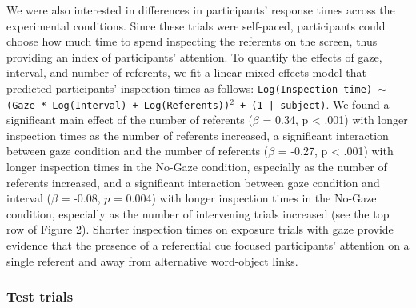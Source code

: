 \documentclass[oneside]{report}
\begin{document}
We were also interested in differences in participants' response times
across the experimental conditions. Since these trials were self-paced,
participants could choose how much time to spend inspecting the
referents on the screen, thus providing an index of participants'
attention. To quantify the effects of gaze, interval, and number of
referents, we fit a linear mixed-effects model that predicted
participants' inspection times as follows:
\texttt{Log(Inspection time) $\sim$ (Gaze * Log(Interval) + Log(Referents))$^2$ + (1 | subject)}.
We found a significant main effect of the number of referents (\(\beta\)
= 0.34, p \textless{} .001) with longer inspection times as the number
of referents increased, a significant interaction between gaze condition
and the number of referents (\(\beta\) = -0.27, p \textless{} .001) with
longer inspection times in the No-Gaze condition, especially as the
number of referents increased, and a significant interaction between
gaze condition and interval (\(\beta\) = -0.08, \(p\) = 0.004) with
longer inspection times in the No-Gaze condition, especially as the
number of intervening trials increased (see the top row of Figure 2).
Shorter inspection times on exposure trials with gaze provide evidence
that the presence of a referential cue focused participants' attention
on a single referent and away from alternative word-object links.

\subsubsection{Test trials}\label{test-trials}
\end{document}
